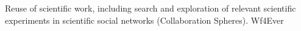 Reuse of scientific work, including search and exploration of relevant scientific experiments in scientific social networks (Collaboration Spheres). Wf4Ever 
